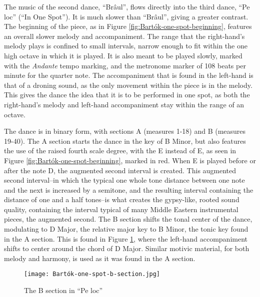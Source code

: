 The music of the second dance, ``Brâul'', flows directly into the third dance, ``Pe loc'' (``In One Spot''). It is much slower than ``Brâul'', giving a greater contrast. The beginning of the piece, as in Figure \ref{fig:Bartók-one-spot-beginning}\autocite{Lung_2016}, features an overall slower melody and accompaniment. The range that the right-hand's melody plays is confined to small intervals, narrow enough to fit within the one high octave in which it is played. It is also meant to be played slowly, marked with the \textit{Andante} tempo marking, and the metronome marker of 108 beats per minute for the quarter note. The accompaniment that is found in the left-hand is that of a droning sound, as the only movement within the piece is in the melody. This gives the dance the idea that it is to be performed in one spot, as both the right-hand's melody and left-hand accompaniment stay within the range of an octave.

The dance is in binary form, with sections A (measures 1-18) and B (measures 19-40). The A section starts the dance in the key of B Minor, but also features the use of the raised fourth scale degree, with the E\musSharp{} instead of E, as seen in Figure \ref{fig:Bartók-one-spot-beginning}\autocite{Lung_2016}, marked in red. When E\musSharp{} is played before or after the note D, the augmented second interval is created. This augmented second interval--in which the typical one whole tone distance between one note and the next is increased by a semitone, and the resulting interval containing the distance of one and a half tones--is what creates the gypsy-like, rooted sound quality, containing the interval typical of many Middle Eastern instrumental pieces, the augmented second. The B section shifts the tonal center of the dance, modulating to D Major, the relative major key to B Minor, the tonic key found in the A section. This is found in Figure \ref{fig:Bartók-one-spot-b-section}\autocite{Lung_2016}, where the left-hand accompaniment shifts to center around the chord of D Major. Similar motivic material, for both melody and harmony, is used as it was found in the A section.

\begin{figure}[h]
  \centering
  \texttt{[image: Bartók-one-spot-b-section.jpg]}
  \caption[The B section of ``Pe loc'', of Bartók's \textit{Romanian Folk Dances, Sz. 56, BB 68}]{The B section in ``Pe loc''}
  \label{fig:Bartók-one-spot-b-section}
\end{figure}

